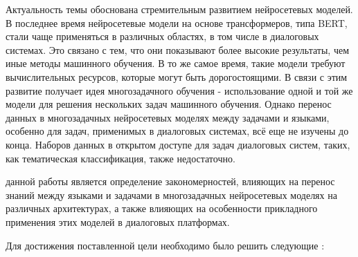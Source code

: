 {\actuality} 
Актуальность темы обоснована стремительным развитием нейросетевых моделей. В последнее время нейросетевые модели на основе трансформеров, типа BERT, стали чаще применяться в различных областях, в том числе в диалоговых системах. Это связано с тем, что они показывают более высокие результаты, чем иные методы машинного обучения. В то же самое время, такие модели требуют вычислительных ресурсов, которые могут быть дорогостоящими. В связи с этим развитие получает идея многозадачного обучения - использование одной и той же модели для решения нескольких задач машинного обучения. Однако перенос данных в многозадачных нейросетевых моделях между задачами и языками, особенно для задач, применимых в диалоговых системах, всё еще не изучены до конца. Наборов данных в открытом доступе для задач диалоговых систем, таких, как тематическая классификация, также недостаточно.


{\aim} данной работы является определение закономерностей, влияющих на перенос знаний между языками и задачами в многозадачных нейросетевых моделях на различных архитектурах, а также влияющих на особенности прикладного применения этих моделей в диалоговых платформах.

Для достижения поставленной цели необходимо было решить следующие {\tasks}:

